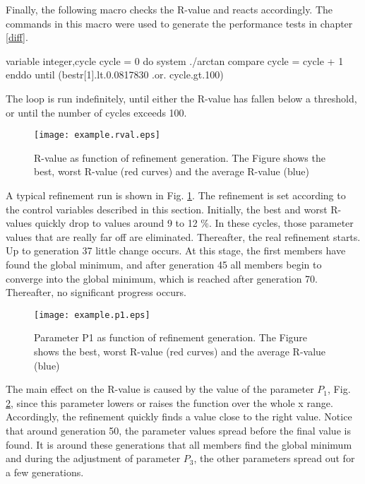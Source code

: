 Finally, the following macro checks the R-value and reacts accordingly.
The commands in this macro were used to generate the performance 
tests in chapter \ref{diff}.

\begin{MacVerbatim}
  variable integer,cycle
  cycle = 0
  do
    system ./arctan
    compare
    cycle = cycle + 1
  enddo until (bestr[1].lt.0.0817830 .or. cycle.gt.100)
\end{MacVerbatim}

The loop is run indefinitely, until either the R-value has fallen
below a threshold, or until the number of cycles exceeds 100.

\begin{figure}
   \texttt{[image: example.rval.eps]}
   \caption{R-value as function of refinement generation. The Figure
            shows the best, worst R-value (red curves) and the average
            R-value (blue)}
   \label{fexa-rval}
\end{figure}

A typical refinement run is shown in Fig. \ref{fexa-rval}. The
refinement is set according to the control variables described in 
this section. Initially, the best and worst R-values quickly drop
to values around 9 to 12 \%. In these cycles, those parameter 
values that are really far off are eliminated. Thereafter, the 
real refinement starts. Up to generation 37 little change occurs.
At this stage, the first members have found the global minimum, 
and after generation 45 all members begin to converge into the 
global minimum, which is reached after generation 70. Thereafter,
no significant progress occurs.

\begin{figure}
   \texttt{[image: example.p1.eps]}
   \caption{Parameter P1 as function of refinement generation. The Figure
            shows the best, worst R-value (red curves) and the average
            R-value (blue)}
   \label{fexa-p1}
\end{figure}

The main effect on the R-value is caused by the value of the parameter 
$P_{1}$, Fig. \ref{fexa-p1}, since this parameter lowers or raises 
the function over the 
whole x range. Accordingly, the refinement quickly finds a value close
to the right value. Notice that around generation 50, the parameter values
spread before the final value is found. It is around these generations
that all members find the global minimum and during the adjustment of
parameter $P_{3}$, the other parameters spread out for a few generations.

